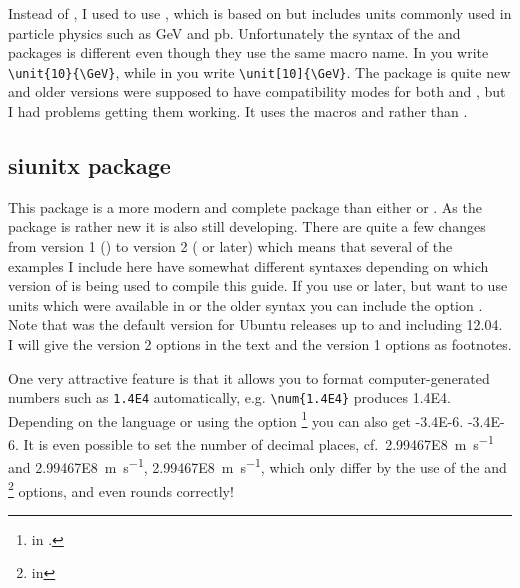 Instead of , I used to use , which
is based on  but includes units commonly used in
particle physics such as \si{\GeV} and \si{\pico\barn}. Unfortunately
the syntax of the  and  packages is
different even though they use the same macro name. In
 you write \verb+\unit{10}{\GeV}+, while in
 you write \verb+\unit[10]{\GeV}+. The
 package is quite new and older versions were
supposed to have compatibility modes for both  and
, but I had problems getting them working. It uses the
macros  and  rather than .


\subsection{siunitx package}
\label{sec:tips:siunitx}

This package is a more modern and complete package than either
 or . As the package is rather new it
is also still developing. There are quite a few changes from version 1
() to version 2 ( or later) which means that several of the
examples I include here have somewhat different syntaxes depending on
which version of \TeXLive is being used to compile this guide. If you
use  or later, but want to use units which were available in
 or the older syntax you can include the option
. Note that  was the
default version for Ubuntu releases up to and including
12.04.
I will give the  version
2 options in the text and the version 1 options as footnotes.

One very attractive feature is that it allows you to format
computer-generated numbers such as \verb+1.4E4+ automatically,
e.g. \verb+\num{1.4E4}+ produces \num{1.4E4}. Depending on the
language or using the option
\footnote{ in .} you can also get
 {%
  \num[expproduct=cdot]{-3.4E-6}.  }{%
  \num[exponent-product=\cdot]{-3.4E-6}.
}
It is even possible to set
the number of decimal places, cf.\ \SI{2.99467E8}{\metre\per\second}
and
 {%
  \SI[dp=1]{2.99467E8}{\metre\per\second}, }{%
  \SI[round-mode=places,round-precision=1]{2.99467E8}{\metre\per\second},
}
which only differ by the use of the  and
\footnote{ in }
options, and even rounds correctly!

